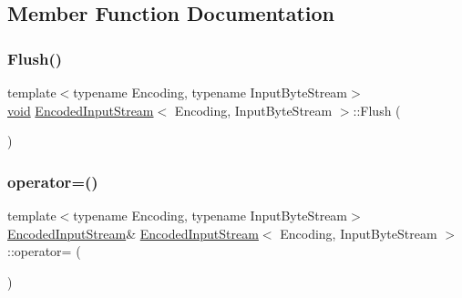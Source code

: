 \subsection{Member Function Documentation}
\mbox{\label{classEncodedInputStream_aa4415bf4b97dd01e8c3de0ad7a161724}} 
\subsubsection{\texorpdfstring{Flush()}{Flush()}}
{\footnotesize\ttfamily template$<$typename Encoding, typename Input\+Byte\+Stream$>$ \\
\hyperlink{imgui__impl__opengl3__loader_8h_ac668e7cffd9e2e9cfee428b9b2f34fa7}{void} \hyperlink{classEncodedInputStream}{Encoded\+Input\+Stream}$<$ Encoding, Input\+Byte\+Stream $>$\+::Flush (\begin{DoxyParamCaption}{ }\end{DoxyParamCaption})\hspace{0.3cm}{\ttfamily [inline]}}

\mbox{\label{classEncodedInputStream_aebee85cf36e2aa4ed25881a95678c4c4}} 
\subsubsection{\texorpdfstring{operator=()}{operator=()}}
{\footnotesize\ttfamily template$<$typename Encoding, typename Input\+Byte\+Stream$>$ \\
\hyperlink{classEncodedInputStream}{Encoded\+Input\+Stream}\& \hyperlink{classEncodedInputStream}{Encoded\+Input\+Stream}$<$ Encoding, Input\+Byte\+Stream $>$\+::operator= (\begin{DoxyParamCaption}\item[{const \hyperlink{classEncodedInputStream}{Encoded\+Input\+Stream}$<$ Encoding, Input\+Byte\+Stream $>$ \&}]{ }\end{DoxyParamCaption})\hspace{0.3cm}{\ttfamily [private]}}

\mbox{\label{classEncodedInputStream_a046ab121d8dd303b9dc14d4b34940fad}} 

